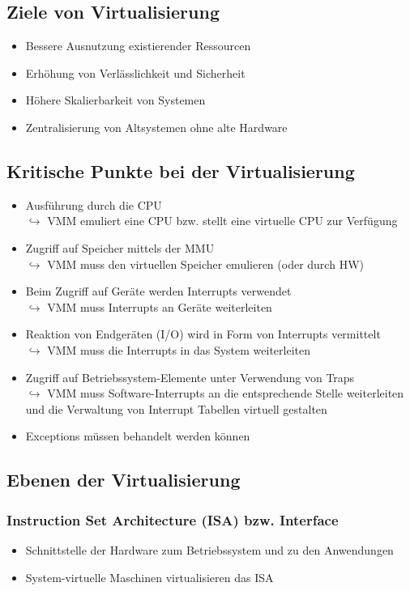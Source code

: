 \documentclass[a4paper,10pt]{scrreprt}
\begin{document}
	\subsection{Ziele von Virtualisierung}
	\begin{itemize}
		\item Bessere Ausnutzung existierender Ressourcen
		\item Erhöhung von Verlässlichkeit und Sicherheit
		\item Höhere Skalierbarkeit von Systemen
		\item Zentralisierung von Altsystemen ohne alte Hardware
	\end{itemize}
	\subsection{Kritische Punkte bei der Virtualisierung}
	\begin{itemize}
		\item Ausführung durch die CPU\\[5pt]
		$\hookrightarrow$ VMM emuliert eine CPU bzw. stellt eine virtuelle CPU zur Verfügung
		\item Zugriff auf Speicher mittels der MMU\\[5pt]
		$\hookrightarrow$ VMM muss den virtuellen Speicher emulieren (oder durch HW)
		\item Beim Zugriff auf Geräte werden Interrupts verwendet\\[5pt]
		$\hookrightarrow$ VMM muss Interrupts an Geräte weiterleiten
		\item Reaktion von Endgeräten (I/O) wird in Form von Interrupts vermittelt\\[5pt]
		$\hookrightarrow$ VMM muss die Interrupts in das System weiterleiten
		\item Zugriff auf Betriebssystem-Elemente unter Verwendung von Traps\\[5pt]
		$\hookrightarrow$ VMM muss Software-Interrupts an die entsprechende Stelle weiterleiten und \hspace*{12pt} die Verwaltung von Interrupt Tabellen virtuell gestalten
		\item Exceptions müssen behandelt werden können
	\end{itemize}
\newpage
	\subsection{Ebenen der Virtualisierung}
	\subsubsection{Instruction Set Architecture (ISA) bzw. Interface}
	\begin{itemize}
		\item Schnittstelle der Hardware zum Betriebssystem und zu den Anwendungen
		\item System-virtuelle Maschinen virtualisieren das ISA
	\end{itemize}
\end{document}
